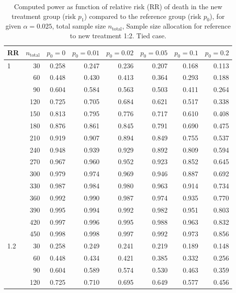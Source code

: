 \documentclass[bimj,fleqn]{w-art}\usepackage[]{graphicx}\usepackage[]{color}
\theoremstyle{plain}
\theoremstyle{definition}
\begin{document}
\begin{table}[ht]
\centering
\caption{Computed power as function of relative risk
             (RR) of death in the new treatment group (risk $p_1$) compared to
             the reference group (risk $p_0$), for given $\alpha =0.025$,
             total sample size $n_{\text{total}}$, Sample size allocation for
             reference to new treatment 1:2. Tied case.} 
\label{tab:AppendixTied}
\begin{tabular}{lrrrrrrr}
  \hline
RR & $n_{\text{total}}$ & $p_0 = 0$ & $p_0 = 0.01$ & $p_0 = 0.02$ & $p_0 = 0.05$ & $p_0 = 0.1$ & $p_0 = 0.2$ \\ 
  \hline
1 & 30 & 0.258 & 0.247 & 0.236 & 0.207 & 0.168 & 0.113 \\ 
   & 60 & 0.448 & 0.430 & 0.413 & 0.364 & 0.293 & 0.188 \\ 
   & 90 & 0.604 & 0.584 & 0.563 & 0.503 & 0.411 & 0.264 \\ 
   & 120 & 0.725 & 0.705 & 0.684 & 0.621 & 0.517 & 0.338 \\ 
   & 150 & 0.813 & 0.795 & 0.776 & 0.717 & 0.610 & 0.408 \\ 
   & 180 & 0.876 & 0.861 & 0.845 & 0.791 & 0.690 & 0.475 \\ 
   & 210 & 0.919 & 0.907 & 0.894 & 0.849 & 0.755 & 0.537 \\ 
   & 240 & 0.948 & 0.939 & 0.929 & 0.892 & 0.809 & 0.594 \\ 
   & 270 & 0.967 & 0.960 & 0.952 & 0.923 & 0.852 & 0.645 \\ 
   & 300 & 0.979 & 0.974 & 0.969 & 0.946 & 0.887 & 0.692 \\ 
   & 330 & 0.987 & 0.984 & 0.980 & 0.963 & 0.914 & 0.734 \\ 
   & 360 & 0.992 & 0.990 & 0.987 & 0.974 & 0.935 & 0.770 \\ 
   & 390 & 0.995 & 0.994 & 0.992 & 0.982 & 0.951 & 0.803 \\ 
   & 420 & 0.997 & 0.996 & 0.995 & 0.988 & 0.963 & 0.832 \\ 
   & 450 & 0.998 & 0.998 & 0.997 & 0.992 & 0.973 & 0.856 \\ 
  1.2 & 30 & 0.258 & 0.249 & 0.241 & 0.219 & 0.189 & 0.148 \\ 
   & 60 & 0.448 & 0.434 & 0.421 & 0.385 & 0.332 & 0.256 \\ 
   & 90 & 0.604 & 0.589 & 0.574 & 0.530 & 0.463 & 0.359 \\ 
   & 120 & 0.725 & 0.710 & 0.695 & 0.649 & 0.577 & 0.456 \\ 

\end{tabular}
\end{table}
\end{document}
